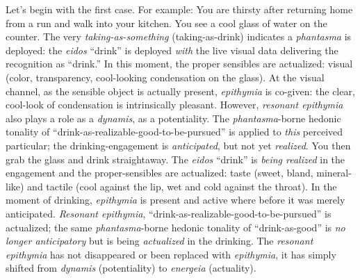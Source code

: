 \documentclass{article}
\begin{document}
Let's begin with the first case. For example: You are thirsty after returning home from a run and walk into your kitchen. You see a cool glass of water on the counter. The very \textit{taking-as-something} (taking-as-drink) indicates a \textit{phantasma} is deployed: the \textit{eidos} ``drink'' is deployed \textit{with} the live visual data delivering the recognition as ``drink.'' In this moment, the proper sensibles are actualized: visual (color, transparency, cool-looking condensation on the glass). At the visual channel, as the sensible object is actually present, \textit{epithymia} is co-given: the clear, cool-look of condensation is intrinsically pleasant. However, \textit{resonant epithymia} also plays a role as a \textit{dynamis}, as a potentiality. The \textit{phantasma}-borne hedonic tonality of ``drink-as-realizable-good-to-be-pursued'' is applied to \textit{this} perceived particular; the drinking-engagement is \textit{anticipated}, but not yet \textit{realized}. You then grab the glass and drink straightaway. The \textit{eidos} ``drink'' is \textit{being realized} in the engagement and the proper-sensibles are actualized: taste (sweet, bland, mineral-like) and tactile (cool against the lip, wet and cold against the throat). In the moment of drinking, \textit{epithymia} is present and active where before it was merely anticipated. \textit{Resonant epithymia}, ``drink-as-realizable-good-to-be-pursued'' is actualized; the same \textit{phantasma}-borne hedonic tonality of ``drink-as-good'' is \textit{no longer anticipatory} but is being \textit{actualized} in the drinking. The \textit{resonant epithymia} has not disappeared or been replaced with \textit{epithymia}, it has simply shifted from \textit{dynamis} (potentiality) to \textit{energeia} (actuality). 
\end{document}
